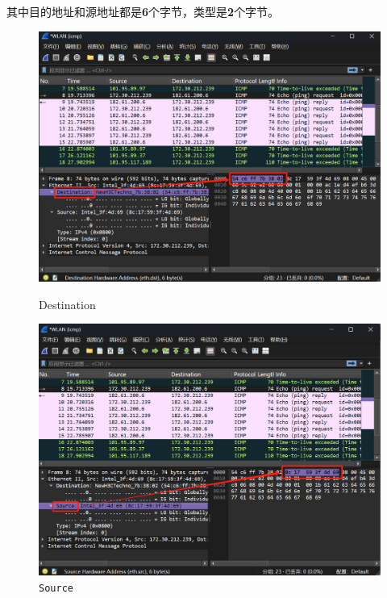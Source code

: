 \documentclass{article}
\begin{document}
	其中目的地址和源地址都是\textbf{6}个字节，类型是\textbf{2}个字节。
	
	\begin{figure}[H]
		\centering
		\begin{minipage}[b]{0.45\textwidth}
			\includegraphics[width=\textwidth]{images/6.Destination.png}
			\caption{Destination}
		\end{minipage}
		\hfill
		\begin{minipage}[b]{0.45\textwidth}
			\includegraphics[width=\textwidth]{images/7.Source.png}
			\caption{\texttt{Source}}
		\end{minipage}
	\end{figure}
	
\end{document}
